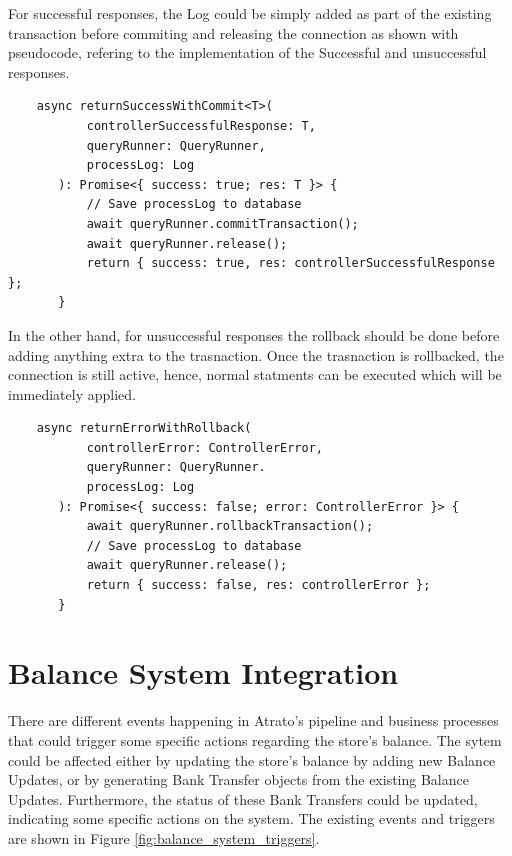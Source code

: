 For successful responses, the Log could be simply added as part of the existing transaction before commiting and releasing the connection as shown with pseudocode, refering to the implementation of the Successful and unsuccessful responses.

\begin{verbatim}
    async returnSuccessWithCommit<T>(
           controllerSuccessfulResponse: T,
           queryRunner: QueryRunner,
           processLog: Log
       ): Promise<{ success: true; res: T }> {
           // Save processLog to database
           await queryRunner.commitTransaction();
           await queryRunner.release();
           return { success: true, res: controllerSuccessfulResponse };
       }
\end{verbatim}

In the other hand, for unsuccessful responses the rollback should be done before adding anything extra to the trasnaction.  Once the trasnaction is rollbacked, the connection is still active, hence, normal statments can be executed which will be immediately applied.

\begin{verbatim}
    async returnErrorWithRollback(
           controllerError: ControllerError,
           queryRunner: QueryRunner.
           processLog: Log
       ): Promise<{ success: false; error: ControllerError }> {
           await queryRunner.rollbackTransaction();
           // Save processLog to database
           await queryRunner.release();
           return { success: false, res: controllerError };
       }
    \end{verbatim}

\section{Balance System Integration}

There are different events happening in Atrato's pipeline and business processes that could trigger some specific actions regarding the store's balance. The sytem could be affected either by updating the store's balance by adding new Balance Updates, or by generating Bank Transfer objects from the existing Balance Updates. Furthermore, the status of these Bank Transfers could be updated, indicating some specific actions on the system. The existing events and triggers are shown in Figure \ref{fig:balance_system_triggers}.

